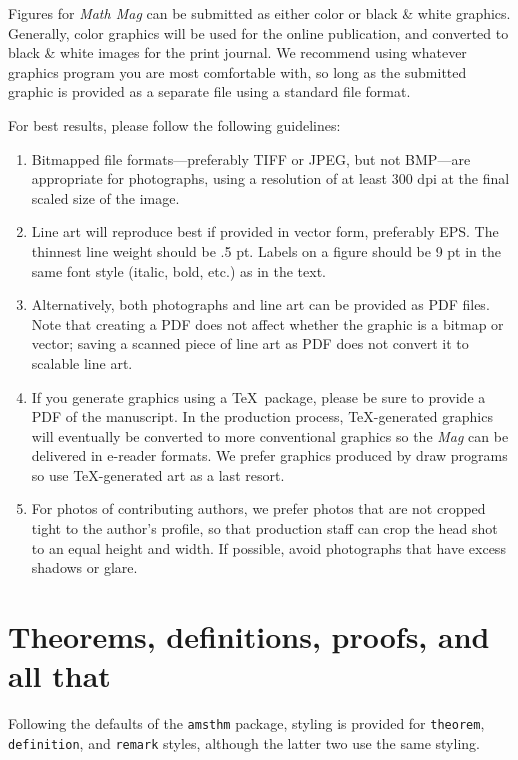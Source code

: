 \documentclass{article}
\theoremstyle{theorem}
\theoremstyle{definition}
\begin{document}
Figures for  \textit{Math Mag} can be submitted as either color or black \& white graphics.  Generally, color graphics will be used for the online publication, and converted to black \& white images for the print journal.  We recommend using whatever graphics program you are most comfortable with, so long as the submitted graphic is provided as a separate file using a standard file format.

For best results, please follow the following guidelines:
\begin{enumerate}
\item Bitmapped file formats---preferably TIFF or JPEG, but not BMP---are appropriate for photographs, using a resolution of at least 300 dpi at the final scaled size of the image.
\item Line art will reproduce best if provided in vector form, preferably EPS. The thinnest line weight should be .5 pt.  Labels on a figure should be 9 pt in the same font style (italic, bold, etc.) as in the text.
\item Alternatively, both photographs and line art can be provided as PDF files.  Note that creating a PDF does not affect whether the graphic is a bitmap or vector; saving a scanned piece of line art as PDF does not convert it to scalable line art.
\item If you generate graphics using a \TeX\ package, please be sure to provide a PDF of the manuscript.  In the production process, \TeX-generated graphics will eventually be converted to more conventional graphics so the \textit{Mag} can be delivered in e-reader formats.  We prefer graphics produced by draw programs so use \TeX-generated art as a last resort.
\item For photos of contributing authors, we prefer photos that are not cropped tight to the author's profile, so that production staff can crop the head shot to an equal height and width.  If possible, avoid photographs that have excess shadows or glare.
\end{enumerate}



\section{Theorems, definitions, proofs, and all that}

Following the defaults of the \texttt{amsthm} package, styling is provided for \texttt{theorem}, \texttt{definition}, and \texttt{remark} styles, although the latter two use the same styling.
\end{document}
